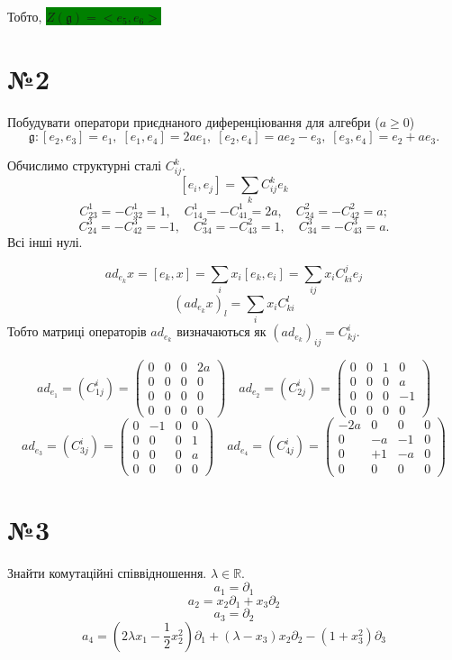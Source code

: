 \documentclass[10pt, a4paper]{article} %
\newcommand{\g}{\mathfrak{g}}
\begin{document}
Тобто, \colorbox{green}{$Z(\g) = <e_5, e_6>$}

\newpage
\section*{№2}
\begin{mdframed}
    Побудувати оператори приєднаного диференціювання для алгебри ($a \ge 0$)
    \[\g : [e_2,e_3]=e_1,\; [e_1,e_4]=2ae_1,\; [e_2,e_4]=ae_2-e_3,\; [e_3,e_4]=e_2+ae_3.\]
\end{mdframed}

Обчислимо структурні сталі $C_{ij}^k$.
\[[e_i, e_j] = \sum_{k} C_{ij}^k e_k\]
\[C_{23}^1 = -C_{32}^1 = 1, \quad C_{14}^1 = -C_{41}^1 = 2a, \quad C_{24}^2 = -C_{42}^2 = a;\]
\[C_{24}^3 = -C_{42}^3 = -1, \quad C_{34}^2 = -C_{43}^2 = 1, \quad C_{34}^3 = -C_{43}^3 = a.\]
Всі інші нулі.

\[ad_{e_k} x = [e_k, x] = \sum_{i} x_i[e_k,e_i] = \sum_{ij} x_i C_{ki}^j e_j\]
\[(ad_{e_k} x)_l = \sum_{i} x_i C_{ki}^l\]
Тобто матриці операторів $ad_{e_k}$ визначаються як $(ad_{e_k})_{ij} = C_{kj}^i$.

\[ad_{e_1} = (C_{1j}^i) = \begin{pmatrix}
    0 & 0 & 0 & 2a\\
    0 & 0 & 0 & 0\\
    0 & 0 & 0 & 0\\
    0 & 0 & 0 & 0
\end{pmatrix} \quad
ad_{e_2} = (C_{2j}^i) = \begin{pmatrix}
    0 & 0 & 1 & 0\\
    0 & 0 & 0 & a\\
    0 & 0 & 0 & -1\\
    0 & 0 & 0 & 0
\end{pmatrix}\]
\[ad_{e_3} = (C_{3j}^i) = \begin{pmatrix}
    0 & -1 & 0 & 0\\
    0 & 0 & 0 & 1\\
    0 & 0 & 0 & a\\
    0 & 0 & 0 & 0
\end{pmatrix} \quad
ad_{e_4} = (C_{4j}^i) = \begin{pmatrix}
    -2a & 0 & 0 & 0\\
    0 & -a & -1 & 0\\
    0 & +1 & -a & 0\\
    0 & 0 & 0 & 0
\end{pmatrix}\]

\newpage
\section*{№3}
\begin{mdframed}
    Знайти комутаційні співвідношення. $\lambda \in \mathbb R$.
    \[a_1 = \partial_1\]
    \[a_2 = x_2\partial_1 + x_3\partial_2\]
    \[a_3 = \partial_2\]
    \[a_4 = (2\lambda x_1 - \frac{1}{2}x_2^2)\partial_1 + (\lambda-x_3)x_2\partial_2 - (1+x_3^2)\partial_3\]
\end{mdframed}
\end{document}
